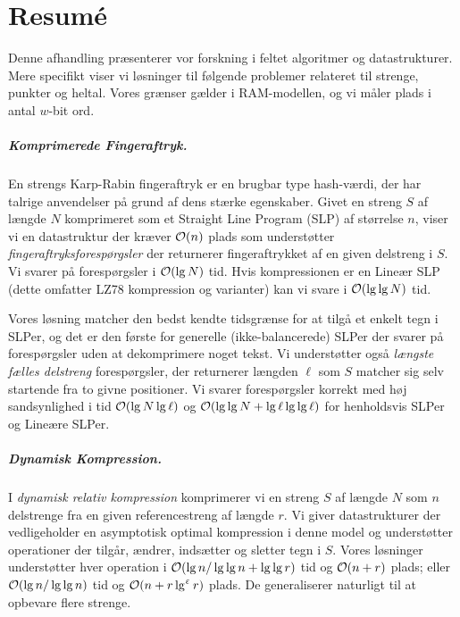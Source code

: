 \chapter{Resumé}
Denne afhandling præsenterer vor forskning i feltet algoritmer og datastrukturer. Mere specifikt viser vi løsninger til følgende problemer relateret til strenge, punkter og heltal. Vores grænser gælder i RAM-modellen, og vi måler plads i antal $w$-bit ord.


\paragraph{Komprimerede Fingeraftryk.}
En strengs Karp-Rabin fingeraftryk er en brugbar type hash-værdi, der har talrige anvendelser på grund af dens stærke egenskaber.
Givet en streng $S$ af længde $N$ komprimeret som et Straight Line Program (SLP) af størrelse $n$, viser vi en datastruktur der kræver $\mathcal{O}(n)$ plads som understøtter \emph{fingeraftryksforespørgsler} der returnerer fingeraftrykket af en given delstreng i $S$.
Vi svarer på forespørgsler i $\mathcal{O}(\lg N)$ tid. Hvis kompressionen er en Lineær SLP (dette omfatter LZ78 kompression og varianter) kan vi svare i $\mathcal{O}(\lg \lg N)$ tid.

Vores løsning matcher den bedst kendte tidsgrænse for at tilgå et enkelt tegn i SLPer, og det er den første for generelle (ikke-balancerede) SLPer der svarer på forespørgsler uden at dekomprimere noget tekst. 
Vi understøtter også \emph{længste fælles delstreng} forespørgsler, der returnerer længden $\ell$ som $S$ matcher sig selv startende fra to givne positioner. 
Vi svarer forespørgsler korrekt med høj sandsynlighed i tid $\mathcal{O}(\lg N \lg \ell)$ og $\mathcal{O}(\lg \lg N + \lg \ell \lg \lg \ell)$ for henholdsvis SLPer og Lineære SLPer.


\paragraph{Dynamisk Kompression.}
I \emph{dynamisk relativ kompression} komprimerer vi en streng $S$ af længde $N$ som $n$ delstrenge fra en given referencestreng af længde $r$.
Vi giver datastrukturer der vedligeholder en asymptotisk optimal kompression i denne model og understøtter operationer der tilgår, ændrer, indsætter og sletter tegn i $S$. 
Vores løsninger understøtter hver operation i $\mathcal{O}(\lg n / \lg \lg n + \lg \lg r)$ tid og $\mathcal{O}(n+r)$ plads; eller $\mathcal{O}(\lg n / \lg \lg n)$ tid og $\mathcal{O}(n+r \lg^{\upvarepsilon} r)$ plads.
De generaliserer naturligt til at opbevare flere strenge.

